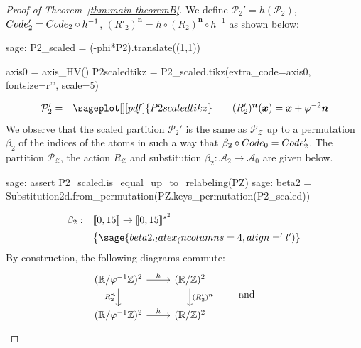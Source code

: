 \documentclass[12pt]{amsart}
\newcommand{\Z}{\mathbb{Z}}
\newcommand{\R}{\mathbb{R}}
\newcommand{\bn}{{\boldsymbol{n}}}
\newcommand{\bx}{{\boldsymbol{x}}}
\newcommand{\Acal}{\mathcal{A}} %
\newcommand{\Pcal}{\mathcal{P}}
\newcommand{\Zcal}{\mathcal{Z}}
\newcommand{\Zrange}[1]{\llbracket0,#1\rrbracket}
\newcommand{\sccode}{\textsc{Code}}
\begin{document}
\begin{proof}[Proof of Theorem~\ref{thm:main-theoremB}]
We define 
$\Pcal_2'=h(\Pcal_2)$,
$\sccode_2'=\sccode_2\circ h^{-1}$,
 $(R'_2)^\bn=h\circ (R_2)^\bn\circ h^{-1}$
as shown below:
\begin{sagecommandlinetcb}
\begin{sagecommandline}
sage: P2_scaled = (-phi*P2).translate((1,1))
\end{sagecommandline}
\end{sagecommandlinetcb}
\begin{sagesilent}
axis0 = axis_HV()
P2scaledtikz = P2_scaled.tikz(extra_code=axis0, fontsize=r'\normalsize', scale=5)
\end{sagesilent}
    \[
    \begin{array}{c}
        \Pcal_2'=
    \end{array}
    \begin{array}{c} 
        \sageplot[][pdf]{P2scaledtikz}
    \end{array}
    \quad
    \begin{array}{l}
        (R'_2)^\bn(\bx)=\bx+\varphi^{-2}\bn
    \end{array}
    \] 
We observe that the scaled partition $\Pcal_2'$ is the same as $\Pcal_\Zcal$
up to a permutation $\beta_2$ of the indices of the atoms
in such a way that $\beta_2\circ\sccode_0=\sccode_2'$.
The partition $\Pcal_\Zcal$, the action $R_\Zcal$ and substitution
$\beta_2:\Acal_2\to\Acal_0$ are given below.
\begin{sagecommandlinetcb}
\begin{sagecommandline}
sage: assert P2_scaled.is_equal_up_to_relabeling(PZ)
sage: beta2 = Substitution2d.from_permutation(PZ.keys_permutation(P2_scaled))
\end{sagecommandline}
\end{sagecommandlinetcb}
    \[
    \begin{array}{ll}
        \beta_2:&\Zrange{15}\to\Zrange{15}^{*^2}\\[2mm]
        &\left\{\arraycolsep=1.8pt
                \sage{beta2._latex_(ncolumns=4, align='l')}
        \right.
    \end{array}
    \]
By construction, the following diagrams commute:
\[ 
\begin{tikzcd}
    (\R/\varphi^{-1}\Z)^2 \arrow{r}{h} \arrow[swap]{d}{R_2^\bn}
    & (\R/\Z)^2 \arrow{d}{(R_2')^\bn} \\%
    (\R/\varphi^{-1}\Z)^2 \arrow{r}{h}
    & (\R/\Z)^2
\end{tikzcd}
\qquad
    \text{ and }
\qquad
\begin{tikzcd}

\end{tikzcd}\]
\end{proof}
\end{document}
